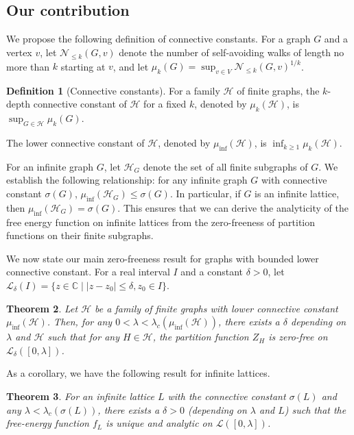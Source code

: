 \documentclass[a4paper,11pt]{article}
\theoremstyle{plain}
\newtheorem{theorem}{Theorem}[section]
\theoremstyle{definition}
\newtheorem{definition}[theorem]{Definition}
\theoremstyle{remark}
\newcommand{\1}{\mathbf{1}}
\begin{document}
\subsection*{Our contribution}
We propose the following definition of connective constants.
For a graph $G$ and a vertex $v$, let
$\mathcal{N}_{\leq k}(G,v)$ denote the number of self-avoiding walks of
length no more than $k$ starting at $v$, and let $\mu_{k}(G)=\sup_{v\in V}{\mathcal{N}_{\leq k}(G,v)}^{1/k}$. 
\begin{definition}[Connective constants]
    For a family $\mathcal{H}$ of finite graphs, the $k$-depth connective constant of $\mathcal{H}$ for a fixed $k$, denoted by $\mu_{k}(\mathcal{H})$, is $\sup_{G\in\mathcal{H}}\mu_k(G)$.

     
     The lower connective constant of $\mathcal{H}$, denoted by $\mu_{\inf}(\mathcal{H})$, is $\inf_{k\geq1}\mu_{k}(\mathcal{H})$.
\end{definition}

For an infinite graph $G$, let $\mathcal{H}_G$ denote the set of all finite subgraphs of $G$. We establish the following relationship: for any infinite graph $G$ with connective constant $\sigma(G)$, $\mu_{\inf}(\mathcal{H}_G) \leq \sigma(G)$. In particular, if $G$ is an infinite lattice, then $\mu_{\inf}(\mathcal{H}_G) = \sigma(G)$. This ensures that we can derive the analyticity of the free energy function on infinite lattices from the zero-freeness of partition functions on their finite subgraphs.

We now state our main zero-freeness result for graphs with bounded lower connective constant. 
 For a real interval $I$ and a constant $\delta>0$, let $\mathcal{L}_\delta(I)=\{z\in \mathbb{C}\mid |z-z_0|\leq \delta, z_0\in I\}$.

\begin{theorem}%
\label{thm:zero_free_main}
Let $\mathcal{H}$ be a family of finite graphs with lower connective constant $\mu_{\inf}(\mathcal{H})$.
Then, for any $0<\lambda<\lambda_c(\mu_{\inf}(\mathcal{H}))$, there exists a $\delta$ depending on $\lambda$ and $\mathcal{H}$ such that for  any $H\in \mathcal{H}$, the partition function $Z_H$ is zero-free on $\mathcal{L}_\delta([0, \lambda])$.
\end{theorem}

As a corollary, we have the following result for infinite lattices.

\begin{theorem}
    \label{thm:infinite_main}
    For an infinite lattice $L$ with the connective constant $\sigma(L)$ and any $\lambda < \lambda_c(\sigma(L))$, there exists a $\delta>0$ (depending on $\lambda$ and $L$) such that the free-energy function $f_L$ is unique and analytic on $\mathcal{L}([0, \lambda])$.
\end{theorem}
\end{document}
